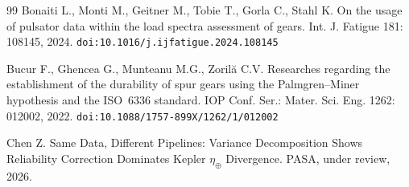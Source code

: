 \documentclass[12pt,a4paper]{article}
\begin{document}
\begin{thebibliography}{99}
Bonaiti L., Monti M., Geitner M., Tobie T., Gorla C., Stahl K.
On the usage of pulsator data within the load spectra assessment of
gears. Int. J. Fatigue 181: 108145, 2024.
\texttt{doi:10.1016/j.ijfatigue.2024.108145}

Bucur F., Ghencea G., Munteanu M.G., Zoril\u{a} C.V.
Researches regarding the establishment of the durability of spur
gears using the Palmgren--Miner hypothesis and the ISO~6336 standard.
IOP Conf. Ser.: Mater. Sci. Eng. 1262: 012002, 2022.
\texttt{doi:10.1088/1757-899X/1262/1/012002}

Chen Z. Same Data, Different Pipelines: Variance Decomposition Shows
Reliability Correction Dominates Kepler $\eta_\oplus$ Divergence.
PASA, under review, 2026.

\end{thebibliography}
\end{document}
